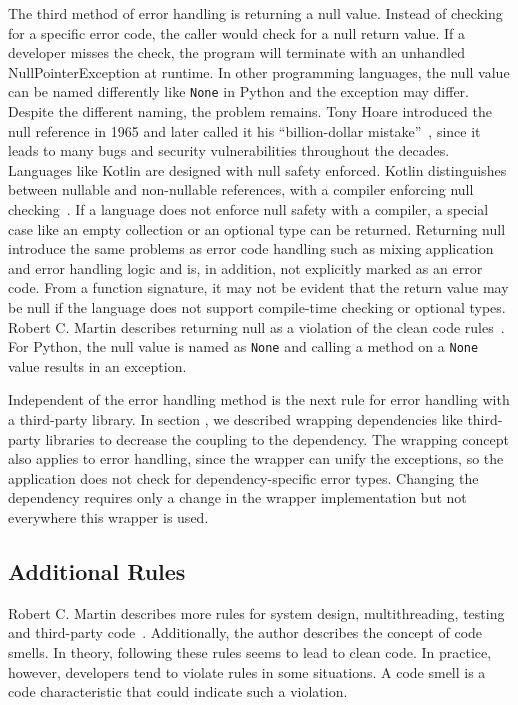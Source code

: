 The third method of error handling is returning a null value. Instead of checking for a specific error code, the caller would check for a null return value. If a developer misses the check, the program will terminate with an unhandled NullPointerException at runtime. In other programming languages, the null value can be named differently like \texttt{None} in Python and the exception may differ. Despite the different naming, the problem remains. Tony Hoare introduced the null reference in 1965 and later called it his \enquote{billion-dollar mistake}~\cite{hoare_null_2009}, since it leads to many bugs and security vulnerabilities throughout the decades. Languages like Kotlin are designed with null safety enforced. Kotlin distinguishes between nullable and non-nullable references, with a compiler enforcing null checking~\cite{noauthor_null_nodate}. If a language does not enforce null safety with a compiler, a special case like an empty collection or an optional type can be returned. 
Returning null introduce the same problems as error code handling such as mixing application and error handling logic and is, in addition, not explicitly marked as an error code. From a function signature, it may not be evident that the return value may be null if the language does not support compile-time checking or optional types. Robert C. Martin describes returning null as a violation of the clean code rules~\cite{martin_clean_2009}. For Python, the null value is named as \texttt{None} and calling a method on a \texttt{None} value results in an exception. 

Independent of the error handling method is the next rule for error handling with a third-party library. In section , we described wrapping dependencies like third-party libraries to decrease the coupling to the dependency. The wrapping concept also applies to error handling, since the wrapper can unify the exceptions, so the application does not check for dependency-specific error types. Changing the dependency requires only a change in the wrapper implementation but not everywhere this wrapper is used. 

\subsection{Additional Rules}
Robert C. Martin describes more rules for system design, multithreading, testing and third-party code~\cite{martin_clean_2009}. 
Additionally, the author describes the concept of code smells. In theory, following these rules seems to lead to clean code. In practice, however, developers tend to violate rules in some situations. A code smell is a code characteristic that could indicate such a violation.

